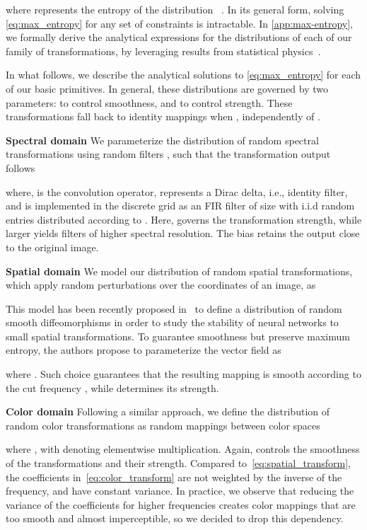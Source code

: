 \documentclass[runningheads]{llncs}
\begin{document}
where  represents the entropy of the distribution ~\cite{cover_info}. In its general form, solving \cref{eq:max_entropy} for any set of constraints  is intractable. In \cref{app:max-entropy}, we formally derive the analytical expressions for the distributions of each of our family of transformations, by leveraging results from statistical physics~\cite{beale}.

In what follows, we describe the analytical solutions to \cref{eq:max_entropy} for each of our basic primitives. In general, these distributions are governed by two parameters:  to control smoothness, and  to control strength. These transformations fall back to identity mappings when , independently of . 

\smallskip\noindent\textbf{Spectral domain} We parameterize the distribution of random spectral transformations using random filters , such that the transformation output follows

where,  is the convolution operator,   represents a Dirac delta, i.e., identity filter, and  is implemented in the discrete grid as an FIR filter of size  with i.i.d random entries distributed according to . Here,  governs the transformation strength, while larger  yields filters of higher spectral resolution. The bias  retains the output close to the original image.

\smallskip\noindent\textbf{Spatial domain} We model our distribution of random spatial transformations, which apply random perturbations over the coordinates of an image, as

This model has been recently proposed in~\cite{diffeo} to define a distribution of random smooth diffeomorphisms in order to study the stability of neural networks to small spatial transformations. To guarantee smoothness but preserve maximum entropy, the authors propose to parameterize the vector field  as

where . Such choice guarantees that the resulting mapping is smooth according to the cut frequency , while  determines its strength.

\smallskip\noindent\textbf{Color domain} Following a similar approach, we define the distribution of random color transformations as random mappings  between color spaces

where , with  denoting elementwise multiplication. Again,  controls the smoothness of the transformations and  their strength. Compared to~\cref{eq:spatial_transform}, the coefficients in~\cref{eq:color_transform} are not weighted by the inverse of the frequency, and have constant variance. In practice, we observe that reducing the variance of the coefficients for higher frequencies creates color mappings that are too smooth and almost imperceptible, so we decided to drop this dependency. 
\end{document}
